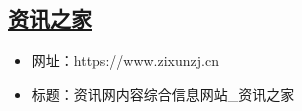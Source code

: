 \subsection{\href{https://www.zixunzj.cn}{资讯之家}}
\begin{itemize}
\item 网址：https://www.zixunzj.cn
\item 标题：资讯网内容综合信息网站_资讯之家
\end{itemize}

